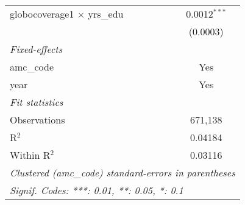 \begin{tabular}{lc}
   globocoverage1 $\times$ yrs\_edu   & 0.0012$^{***}$\\   
                                      & (0.0003)\\   
   \midrule
   \emph{Fixed-effects}\\
   amc\_code                          & Yes\\  
   year                               & Yes\\  
   \midrule
   \emph{Fit statistics}\\
   Observations                       & 671,138\\  
   R$^2$                              & 0.04184\\  
   Within R$^2$                       & 0.03116\\  
   \midrule \midrule
   \multicolumn{2}{l}{\emph{Clustered (amc\_code) standard-errors in parentheses}}\\
   \multicolumn{2}{l}{\emph{Signif. Codes: ***: 0.01, **: 0.05, *: 0.1}}\\
\end{tabular}
\par\endgroup



